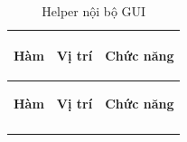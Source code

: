 \documentclass[14pt,a4paper]{report}
\begin{document}
\begin{longtable}{|>{\bfseries\raggedright\arraybackslash}p{}|
                   >{\bfseries\raggedright\arraybackslash}p{2.8cm}|
                   >{\raggedright\arraybackslash}p{}|}
\caption{Helper nội bộ GUI}\\
\hline
\rowcolor{headergray}
\color{white}\textbf{Hàm} & \color{white}\textbf{Vị trí} & \color{white}\textbf{Chức năng} \\
\hline
\endfirsthead

\hline
\rowcolor{headergray}
\color{white}\textbf{Hàm} & \color{white}\textbf{Vị trí} & \color{white}\textbf{Chức năng} \\
\hline
\endhead

\hline
\endfoot

\hline
\endlastfoot


\end{longtable}
\end{document}
